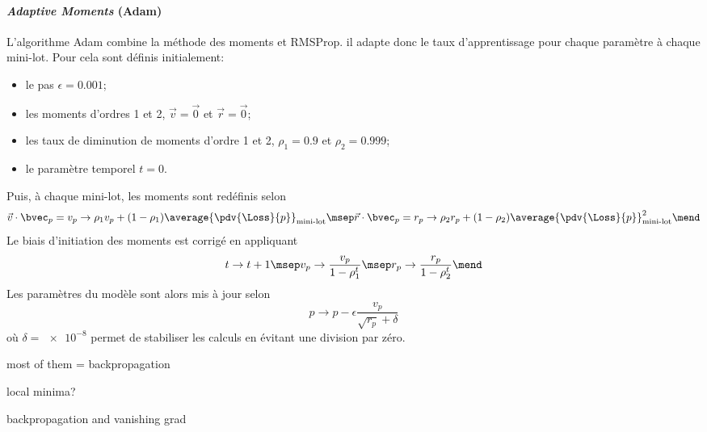 \paragraph{\emph{Adaptive Moments} (Adam)} \cite{adam,DNN}
L'algorithme Adam
combine
la méthode des moments
et
RMSProp.
il adapte donc le taux d'apprentissage pour chaque paramètre à chaque mini-lot.
Pour cela sont définis initialement:
\begin{itemize}
\item le pas $\epsilon=\num{0.001}$;
\item les moments d'ordres 1 et 2, $\vec{v}=\vec{0}$ et $\vec{r}=\vec{0}$;
\item les taux de diminution de moments d'ordre 1 et 2, $\rho_1=\num{0.9}$ et $\rho_2=\num{0.999}$;
\item le paramètre temporel $t=0$.
\end{itemize}
Puis, à chaque mini-lot, les moments sont redéfinis selon
\begin{equation}
\vec{v}\cdot\bvec_p =
v_p \to \rho_1 v_p + (1-\rho_1) \average{\pdv{\Loss}{p}}_\text{mini-lot}
\msep
\vec{r}\cdot\bvec_p =
r_p \to \rho_2 r_p + (1-\rho_2) \average{\pdv{\Loss}{p}}_\text{mini-lot}^2
\mend
\end{equation}
Le biais d'initiation des moments est corrigé en appliquant
\begin{equation}
t \to t+1
\msep
v_p \to \frac{v_p}{1-\rho_1^t}
\msep
r_p \to \frac{r_p}{1-\rho_2^t}
\mend
\end{equation}
Les paramètres du modèle sont alors mis à jour selon
\begin{equation}
p \to p - \epsilon \frac{v_p}{\sqrt{r_p}+\delta}
\end{equation}
où
$\delta=\num{e-8}$ permet de stabiliser les calculs en évitant une division par zéro.


most of them = backpropagation
\par
local minima?
\par
backpropagation and vanishing grad